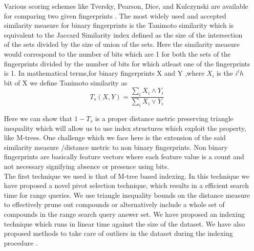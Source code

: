 Various scoring schemes like Tversky, Pearson, Dice, and Kulczynski are available for comparing two given fingerprints \cite{willett2006similarity,swamidass2007bounds}. The most widely used and accepted similarity measure for binary fingerprints is the Tanimoto similarity which is equivalent to the Jaccard Similarity index defined as the size of the intersection of the sets divided by the size of union of the sets. Here the similarity measure would correspond to the number of bits which are 1 for both the sets of the fingerprints divided by the number of bits for which atleast one of the fingerprints is 1. In mathematical terms,for binary fingerprints X and Y ,where $X_i$ is the $i^th$ bit of X we define Tanimoto similarity as	
\begin{equation}
 T_s(X,Y) = \frac{\sum \limits_i X_i \wedge Y_i}
{\sum \limits_i X_i \vee Y_i} 
\end{equation}	

Here we can show that $1-T_s$ is a proper distance metric preserving triangle inequality which will allow us to use index structures which exploit the property, like M-trees. One challenge which we face here is the extension of the said similarity measure /distance metric to non binary fingerprints. Non binary fingerprints are basically feature vectors where each feature value is a count and not necessary signifying absence or presence using bits. \\

%

The first technique we used is that of M-tree \cite{ciaccia1997indexing} based indexing. In this technique we have proposed a novel pivot selection technique, which results in a efficient search time for range queries. We use triangle inequality bounds on the distance measure to effectively prune out compounds or alternatively include a whole set of compounds in the range search query answer set. We have proposed an indexing technique which runs in linear time against the size of the dataset. We have also proposed methods to take care of outliers in the dataset during the indexing procedure .\\

